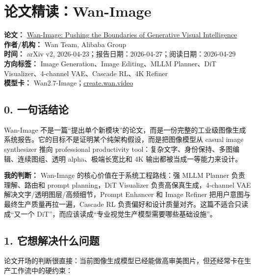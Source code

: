 
\section{论文精读：Wan-Image}

\begin{conceptbox}
\textbf{论文：} \href{https://arxiv.org/abs/2604.19858}{Wan-Image: Pushing the Boundaries of Generative Visual Intelligence}\\
\textbf{作者/机构：} Wan Team, Alibaba Group\\
\textbf{时间：} arXiv v2, 2026-04-23；报告日期：2026-04-27；阅读日期：2026-04-29\\
\textbf{方向标签：} Image Generation、Image Editing、MLLM Planner、DiT Visualizer、4-channel VAE、Cascade RL、4K Refiner\\
\textbf{模型卡：} Wan2.7-Image；\href{https://create.wan.video/generate/image/generate?model=wan2.7-pro}{create.wan.video}
\end{conceptbox}

\subsection{0. 一句话结论}

Wan-Image 不是一篇“提出单个新模块”的论文，而是一份完整的工业级图像生成系统报告。它的目标不是证明某个纯架构假设，而是把图像模型从 casual image synthesizer 推向 professional productivity tool：复杂文字、身份保持、多图编辑、连续图组、透明 alpha、极端长宽比和 4K 输出都被当成一等能力来设计。

\begin{summarybox}
\textbf{我的判断：} Wan-Image 的核心价值在于系统工程路线：强 MLLM Planner 负责理解、路由和 prompt planning，DiT Visualizer 负责高保真生成，4-channel VAE 解决文字/透明图层/高频细节，Prompt Enhancer 和 Image Refiner 把用户意图与最终生产质量再拉一遍，Cascade RL 负责偏好和设计质量对齐。这篇不适合只读成“又一个 DiT”，而应该读成“专业视觉生产模型需要哪些基础设施”。
\end{summarybox}

\subsection{1. 它想解决什么问题}

论文开场的判断很直接：当前图像生成模型已经能做高审美图片，但还经常卡在生产工作流中的硬约束：


